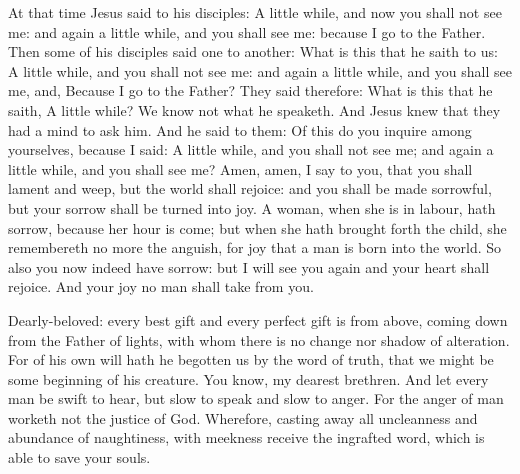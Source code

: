\begin{multicols}{2}
At that time Jesus said to his disciples: 
A little while, and now you shall not see me: and again a little while, and you
shall see me: because I go to the Father.  Then some of his disciples said one
to another: What is this that he saith to us: A little while, and you shall not
see me: and again a little while, and you shall see me, and, Because I go to
the Father?  They said therefore: What is this that he saith, A little while?
We know not what he speaketh.  And Jesus knew that they had a mind to ask him.
And he said to them: Of this do you inquire among yourselves, because I said: A
little while, and you shall not see me; and again a little while, and you shall
see me?  Amen, amen, I say to you, that you shall lament and weep, but the
world shall rejoice: and you shall be made sorrowful, but your sorrow shall be
turned into joy.  A woman, when she is in labour, hath sorrow, because her hour
is come; but when she hath brought forth the child, she remembereth no more the
anguish, for joy that a man is born into the world.  So also you now indeed
have sorrow: but I will see you again and your heart shall rejoice. And your
joy no man shall take from you.


\bigskip



Dearly-beloved: every best gift and every perfect gift is from above, coming down from the
Father of lights, with whom there is no change nor shadow of alteration.  For
of his own will hath he begotten us by the word of truth, that we might be some
beginning of his creature.   You know, my dearest brethren. And let every
man be swift to hear, but slow to speak and slow to anger.  For the anger of
man worketh not the justice of God.  Wherefore, casting away all uncleanness
and abundance of naughtiness, with meekness receive the ingrafted word, which
is able to save your souls.




\end{multicols}

